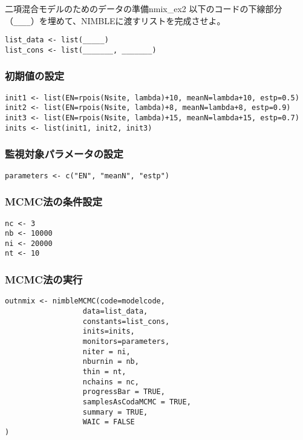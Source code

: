 \begin{exercise}{二項混合モデルのためのデータの準備}{nmix_ex2}
以下のコードの下線部分（\verb|____|）を埋めて、NIMBLEに渡すリストを完成させよ。
\begin{verbatim}
list_data <- list(_____)
list_cons <- list(_______, _______)
\end{verbatim}
\end{exercise}

		\subsubsection{初期値の設定}
\begin{verbatim}
init1 <- list(EN=rpois(Nsite, lambda)+10, meanN=lambda+10, estp=0.5)
init2 <- list(EN=rpois(Nsite, lambda)+8, meanN=lambda+8, estp=0.9)
init3 <- list(EN=rpois(Nsite, lambda)+15, meanN=lambda+15, estp=0.7)
inits <- list(init1, init2, init3)
\end{verbatim}
		\subsubsection{監視対象パラメータの設定}
\begin{verbatim}
parameters <- c("EN", "meanN", "estp") 
\end{verbatim}
		\subsubsection{MCMC法の条件設定}
\begin{verbatim}
nc <- 3
nb <- 10000
ni <- 20000
nt <- 10
\end{verbatim}
		\subsubsection{MCMC法の実行}
\begin{verbatim}
outnmix <- nimbleMCMC(code=modelcode,
                  data=list_data,
                  constants=list_cons,
                  inits=inits,
                  monitors=parameters,
                  niter = ni,
                  nburnin = nb,
                  thin = nt,
                  nchains = nc,
                  progressBar = TRUE,
                  samplesAsCodaMCMC = TRUE,
                  summary = TRUE,
                  WAIC = FALSE
)
\end{verbatim}
